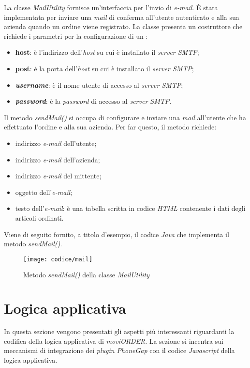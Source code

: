 La classe \textit{MailUtility} fornisce un'interfaccia per l'invio di \textit{e-mail}. È stata implementata per inviare una \textit{mail} di conferma all'utente autenticato e alla sua azienda quando un ordine viene registrato. La classe presenta un costruttore che richiede i parametri per la configurazione di un :
\begin{itemize}
	\item \textbf{host}: è l'indirizzo dell'\textit{host} su cui è installato il \textit{server SMTP};
	\item \textbf{post}: è la porta dell'\textit{host} su cui è installato il \textit{server SMTP};
	\item \textbf{\textit{username}}: è il nome utente di accesso al \textit{server SMTP};
	\item \textbf{\textit{password}}: è la \textit{password} di accesso al \textit{server SMTP}.
\end{itemize}
Il metodo \textit{sendMail()} si occupa di configurare e inviare una \textit{mail} all'utente che ha effettuato l'ordine e alla sua azienda. Per far questo, il metodo richiede:
\begin{itemize}
	\item indirizzo \textit{e-mail} dell'utente;
	\item indirizzo \textit{e-mail} dell'azienda;
	\item indirizzo \textit{e-mail} del mittente;
	\item oggetto dell'\textit{e-mail};
	\item testo dell'\textit{e-mail}: è una tabella scritta in codice \textit{HTML} contenente i dati degli articoli ordinati.
\end{itemize}
Viene di seguito fornito, a titolo d'esempio, il codice \textit{Java} che implementa il metodo \textit{sendMail()}.

\newpage

\begin{figure}[!h] 
    \centering 
    \texttt{[image: codice/mail]} 
    \caption{Metodo \textit{sendMail()} della classe \textit{MailUtility}}
\end{figure}
\section{Logica applicativa}

In questa sezione vengono presentati gli aspetti più interessanti riguardanti la codifica della logica applicativa di \textit{moviORDER}. La sezione si incentra sui meccanismi di integrazione dei \textit{plugin} \textit{PhoneGap} con il codice \textit{Javascript} della logica applicativa.

